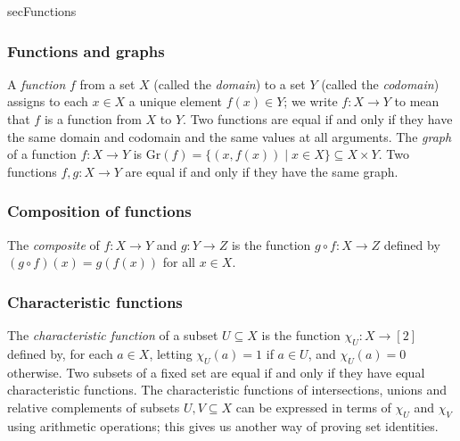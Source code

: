 \begin{tldr}{secFunctions}

\subsubsection*{Functions and graphs}

\begin{tldrlist}
 A \textit{function} $f$ from a set $X$ (called the \textit{domain}) to a set $Y$ (called the \textit{codomain}) assigns to each $x \in X$ a unique element $f(x) \in Y$; we write $f : X \to Y$ to mean that $f$ is a function from $X$ to $Y$.
 Two functions are equal if and only if they have the same domain and codomain and the same values at all arguments.
 The \textit{graph} of a function $f : X \to Y$ is $\mathrm{Gr}(f) = \{ (x,f(x)) \mid x \in X \} \subseteq X \times Y$. Two functions $f,g : X \to Y$ are equal if and only if they have the same graph.
\end{tldrlist}

\subsubsection*{Composition of functions}

\begin{tldrlist}
 The \textit{composite} of $f : X \to Y$ and $g : Y \to Z$ is the function $g \circ f : X \to Z$ defined by $(g \circ f)(x) = g(f(x))$ for all $x \in X$.
\end{tldrlist}

\subsubsection*{Characteristic functions}

\begin{tldrlist}
 The \textit{characteristic function} of a subset $U \subseteq X$ is the function $\chi_U : X \to [2]$ defined by, for each $a \in X$, letting $\chi_U(a) = 1$ if $a \in U$, and $\chi_U(a) = 0$ otherwise.
 Two subsets of a fixed set are equal if and only if they have equal characteristic functions.
 The characteristic functions of intersections, unions and relative complements of subsets $U,V \subseteq X$ can be expressed in terms of $\chi_U$ and $\chi_V$ using arithmetic operations; this gives us another way of proving set identities.
\end{tldrlist}


\end{tldr}
